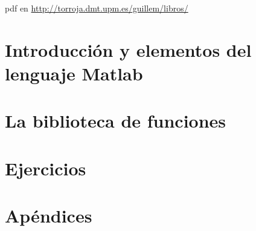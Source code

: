 \documentclass[10pt,fleqn,a4]{book}
\begin{document}
pdf en \url{http://torroja.dmt.upm.es/guillem/libros/}

\tableofcontents{}

\listoffigures


\part{Introducción y elementos del lenguaje Matlab}





\part{La biblioteca de funciones}









\part{Ejercicios}




\appendix

\part{Apéndices}




\end{document}
